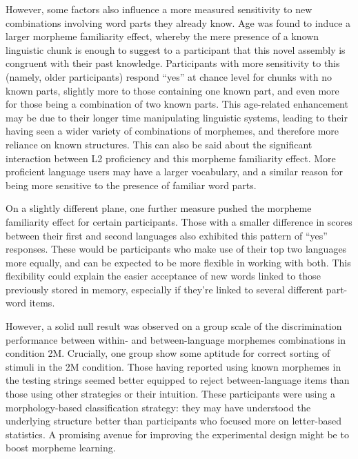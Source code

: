 However, some factors also influence a more measured sensitivity to new combinations involving word parts they already know. Age was found to induce a larger morpheme familiarity effect, whereby the mere presence of a known linguistic chunk is enough to suggest to a participant that this novel assembly is congruent with their past knowledge. Participants with more sensitivity to this (namely, older participants) respond ``yes'' at chance level for chunks with no known parts, slightly more to those containing one known part, and even more for those being a combination of two known parts. This age-related enhancement may be due to their longer time manipulating linguistic systems, leading to their having seen a wider variety of combinations of morphemes, and therefore more reliance on known structures. This can also be said about the significant interaction between L2 proficiency and this morpheme familiarity effect. More proficient language users may have a larger vocabulary, and a similar reason for being more sensitive to the presence of familiar word parts.

On a slightly different plane, one further measure pushed the morpheme familiarity effect for certain participants. Those with a smaller difference in scores between their first and second languages also exhibited this pattern of ``yes'' responses. These would be participants who make use of their top two languages more equally, and can be expected to be more flexible in working with both. This flexibility could explain the easier acceptance of new words linked to those previously stored in memory, especially if they're linked to several different part-word items.

However, a solid null result was observed on a group scale of the discrimination performance between within- and between-language morphemes combinations in condition 2M. Crucially, one group show some aptitude for correct sorting of stimuli in the 2M condition. Those having reported using known morphemes in the testing strings seemed better equipped to reject between-language items than those using other strategies or their intuition. These participants were using a morphology-based classification strategy: they may have understood the underlying structure better than participants who focused more on letter-based statistics. A promising avenue for improving the experimental design might be to boost morpheme learning.